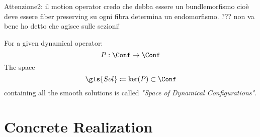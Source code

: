 \documentclass[Main]{subfiles}
\begin{document}
		Attenzione2: il motion operator credo che debba essere un bundlemorfismo cioè deve essere fiber preserving su ogni fibra determina un endomorfismo. ??? non va bene ho detto che agisce sulle sezioni!

		\begin{notationfix}
		For a given dynamical operator:%
		\begin{displaymath}
			P: \Conf \rightarrow \Conf
		\end{displaymath}
		The space
		\begin{displaymath}
		\gls{Sol} \coloneqq \ker(P) \subset \Conf
		\end{displaymath}
		containing all the smooth solutions is called \emph{"Space of Dynamical Configurations"}.
	\end{notationfix}

	\section{Concrete Realization}
\end{document}
